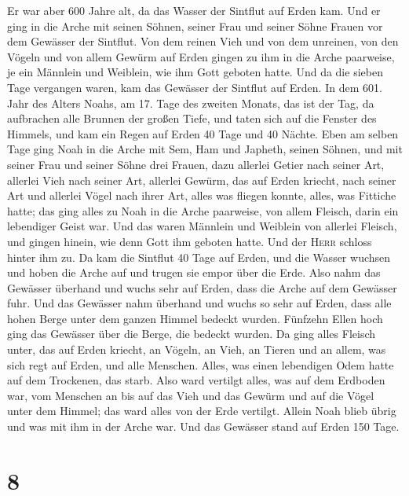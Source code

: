  Er war aber 600 Jahre alt, da das Wasser der Sintflut auf
Erden kam.  Und er ging in die Arche mit seinen Söhnen,
seiner Frau und seiner Söhne Frauen vor dem Gewässer der Sintflut.
 Von dem reinen Vieh und von dem unreinen, von den Vögeln
und von allem Gewürm auf Erden  gingen zu ihm in die Arche
paarweise, je ein Männlein und Weiblein, wie ihm Gott geboten hatte.
 Und da die sieben Tage vergangen waren, kam das Gewässer
der Sintflut auf Erden.  In dem 601. Jahr des Alters
Noahs, am 17. Tage des zweiten Monats, das ist der Tag, da aufbrachen
alle Brunnen der großen Tiefe, und taten sich auf die Fenster des
Himmels,  und kam ein Regen auf Erden 40 Tage und 40
Nächte.  Eben am selben Tage ging Noah in die Arche mit
Sem, Ham und Japheth, seinen Söhnen, und mit seiner Frau und seiner
Söhne drei Frauen,  dazu allerlei Getier nach seiner Art,
allerlei Vieh nach seiner Art, allerlei Gewürm, das auf Erden kriecht,
nach seiner Art und allerlei Vögel nach ihrer Art, alles was fliegen
konnte, alles, was Fittiche hatte;  das ging alles zu
Noah in die Arche paarweise, von allem Fleisch, darin ein lebendiger
Geist war.  Und das waren Männlein und Weiblein von
allerlei Fleisch, und gingen hinein, wie denn Gott ihm geboten hatte.
Und der \textsc{Herr} schloss hinter ihm zu.  Da kam die
Sintflut 40 Tage auf Erden, und die Wasser wuchsen und hoben die Arche
auf und trugen sie empor über die Erde.  Also nahm das
Gewässer überhand und wuchs sehr auf Erden, dass die Arche auf dem
Gewässer fuhr.  Und das Gewässer nahm überhand und wuchs
so sehr auf Erden, dass alle hohen Berge unter dem ganzen Himmel bedeckt
wurden.  Fünfzehn Ellen hoch ging das Gewässer über die
Berge, die bedeckt wurden.  Da ging alles Fleisch unter,
das auf Erden kriecht, an Vögeln, an Vieh, an Tieren und an allem, was
sich regt auf Erden, und alle Menschen.  Alles, was einen
lebendigen Odem hatte auf dem Trockenen, das starb.  Also
ward vertilgt alles, was auf dem Erdboden war, vom Menschen an bis auf
das Vieh und das Gewürm und auf die Vögel unter dem Himmel; das ward
alles von der Erde vertilgt. Allein Noah blieb übrig und was mit ihm in
der Arche war.  Und das Gewässer stand auf Erden 150
Tage.

\hypertarget{section-7}{%
\section{8}\label{section-7}}

